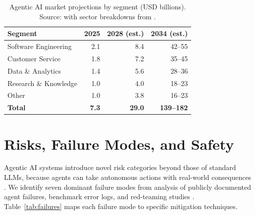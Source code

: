 \documentclass[review,authoryear]{elsarticle}
\theoremstyle{definition}
\begin{document}
\begin{table}[ht]
\centering
\caption{Agentic AI market projections by segment (USD billions). Source: \citet{grandview2025agentic} with sector breakdowns from \citet{mckinsey2024state}.}
\label{tab:market}
\begin{tabular}{lrrr}
\toprule
\textbf{Segment} & \textbf{2025} & \textbf{2028 (est.)} & \textbf{2034 (est.)} \\
\midrule
Software Engineering    & 2.1  & 8.4   & 42--55 \\
Customer Service        & 1.8  & 7.2   & 35--45 \\
Data \& Analytics       & 1.4  & 5.6   & 28--36 \\
Research \& Knowledge   & 1.0  & 4.0   & 18--23 \\
Other                   & 1.0  & 3.8   & 16--23 \\
\midrule
\textbf{Total}          & \textbf{7.3} & \textbf{29.0} & \textbf{139--182} \\
\bottomrule
\end{tabular}
\end{table}

\section{Risks, Failure Modes, and Safety}\label{sec:risks}

Agentic AI systems introduce novel risk categories beyond those of standard LLMs, because agents can take autonomous actions with real-world consequences \citep{amodei2016concrete,hendrycks2022xrisk}. We identify seven dominant failure modes from analysis of publicly documented agent failures, benchmark error logs, and red-teaming studies \citep{perez2022red,ruan2024identifying}. Table~\ref{tab:failures} maps each failure mode to specific mitigation techniques.
\end{document}
